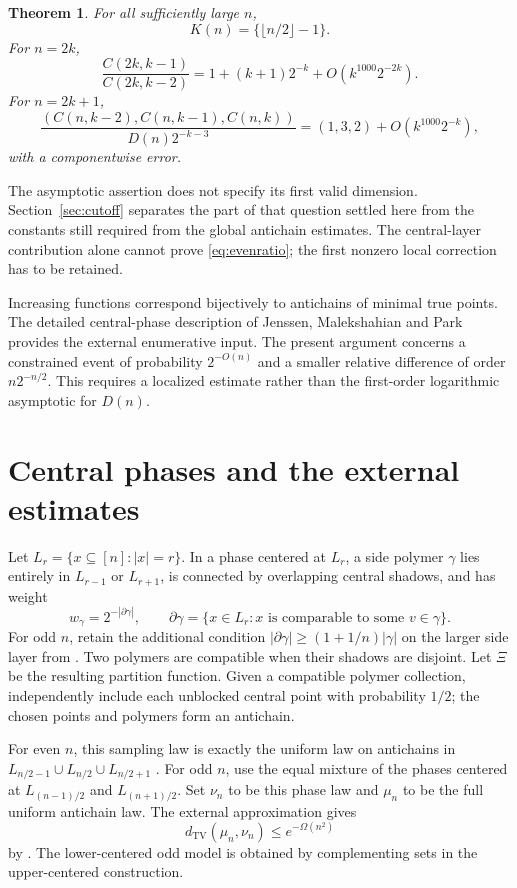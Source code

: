 \documentclass[11pt]{article}
\newtheorem{theorem}{Theorem}[section]
\theoremstyle{remark}\newtheorem{remark}[theorem]{Remark}
\newcommand{\TV}{d_{\mathrm{TV}}}
\begin{document}
\begin{theorem}\label{thm:main}
For all sufficiently large $n$,
\[
 K(n)=\{\lfloor n/2\rfloor-1\}.
\]
For $n=2k$,
\begin{equation}\label{eq:evenratio}
 \frac{C(2k,k-1)}{C(2k,k-2)}
 =1+(k+1)2^{-k}+O(k^{1000}2^{-2k}).
\end{equation}
For $n=2k+1$,
\begin{equation}\label{eq:oddvector}
 \frac{(C(n,k-2),C(n,k-1),C(n,k))}{D(n)2^{-k-3}}
 =(1,3,2)+O(k^{1000}2^{-k}),
\end{equation}
with a componentwise error.
\end{theorem}

The asymptotic assertion does not specify its first valid dimension.
Section~\ref{sec:cutoff} separates the part of that question settled here
from the constants still required from the global antichain estimates.
The central-layer contribution alone cannot prove
\eqref{eq:evenratio}; the first nonzero local correction has to be retained.

Increasing functions correspond bijectively to antichains of minimal true
points. The detailed central-phase description of Jenssen, Malekshahian and
Park \cite{JMP} provides the external enumerative input. The present
argument concerns a constrained event of probability $2^{-O(n)}$ and a
smaller relative difference of order $n2^{-n/2}$. This requires a localized
estimate rather than the first-order logarithmic asymptotic for $D(n)$.

\section{Central phases and the external estimates}\label{sec:phase}
Let $L_r=\{x\subseteq[n]:|x|=r\}$. In a phase centered at $L_r$, a side
polymer $\gamma$ lies entirely in $L_{r-1}$ or $L_{r+1}$, is connected by
overlapping central shadows, and has weight
\[
 w_\gamma=2^{-|\partial\gamma|},\qquad
 \partial\gamma=\{x\in L_r:x\text{ is comparable to some }v\in\gamma\}.
\]
For odd $n$, retain the additional condition
$|\partial\gamma|\ge(1+1/n)|\gamma|$ on the larger side layer from
\cite[Section 4]{JMP}. Two polymers are compatible when their shadows are
disjoint. Let $\Xi$ be the resulting partition function. Given a compatible
polymer collection, independently include each unblocked central point
with probability $1/2$; the chosen points and polymers form an antichain.

For even $n$, this sampling law is exactly the uniform law on antichains
in $L_{n/2-1}\cup L_{n/2}\cup L_{n/2+1}$
\cite[Lemma 6.1]{JMP}. For odd $n$, use the equal mixture of the phases
centered at $L_{(n-1)/2}$ and $L_{(n+1)/2}$. Set $\nu_n$ to be this phase
law and $\mu_n$ to be the full uniform antichain law. The external
approximation gives
\begin{equation}\label{eq:globaltv}
 \TV(\mu_n,\nu_n)\le e^{-\Omega(n^2)}
\end{equation}
by \cite[Theorem 1.7 and Corollary 7.10]{JMP}. The lower-centered odd model
is obtained by complementing sets in the upper-centered construction.
\end{document}
